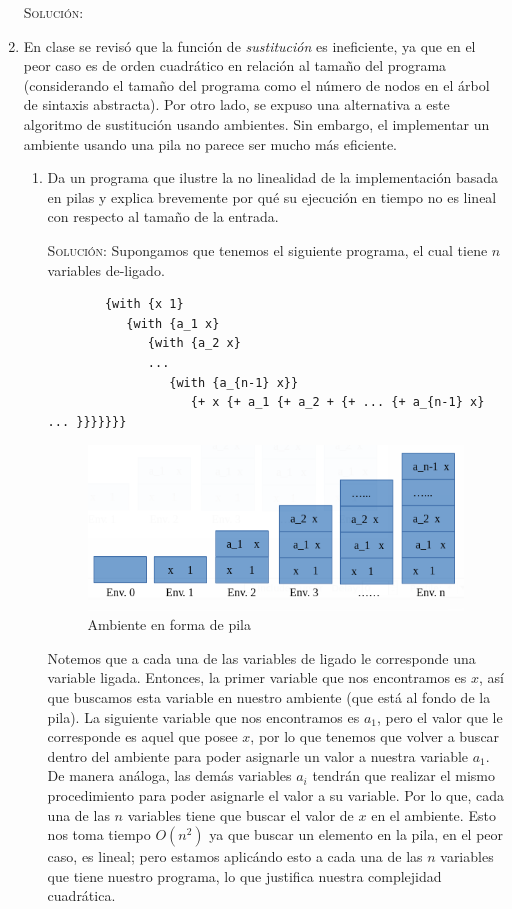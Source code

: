 \documentclass[letterpaper,11pt]{article}
\begin{document}
\begin{enumerate}
   \textsc{Solución:}

   \item En clase se revisó que la función de \textit{sustitución} es 
   ineficiente, ya que en el peor caso es de orden cuadrático en relación 
   al tamaño del programa (considerando el tamaño del programa como el 
   número de nodos en el árbol de sintaxis abstracta). Por otro lado, se 
   expuso una alternativa a este algoritmo de sustitución usando 
   ambientes. Sin embargo, el implementar un ambiente usando una pila no 
   parece ser mucho más eficiente.
   \begin{enumerate}
        \item Da un programa que ilustre la no linealidad de la implementación
        basada en pilas y explica brevemente por qué su ejecución en tiempo no
        es lineal con respecto al tamaño de la entrada.

        \textsc{Solución:} Supongamos que tenemos el siguiente programa, el 
        cual tiene $n$ variables de-ligado.
        \begin{verbatim}
        {with {x 1} 
           {with {a_1 x} 
              {with {a_2 x} 
              ...
                 {with {a_{n-1} x}} 
                    {+ x {+ a_1 {+ a_2 + {+ ... {+ a_{n-1} x} ... }}}}}}}
        \end{verbatim}

        \begin{figure}[h]
            \centering
            \includegraphics[width=0.5\linewidth]{imagenes/ejercicio3.png}
            \caption{Ambiente en forma de pila}
        \end{figure}

        Notemos que a cada una de las variables de ligado le corresponde una 
        variable ligada. Entonces, la primer variable que nos encontramos es
        $x$, así que buscamos esta variable en nuestro ambiente (que está al 
        fondo de la pila). La siguiente variable que nos encontramos es 
        \texttt{$a_1$}, pero el valor que le corresponde es aquel que posee 
        $x$, por lo que tenemos que volver a buscar dentro del ambiente 
        para poder asignarle un valor a nuestra variable \texttt{$a_1$}. 
        De manera análoga, las demás variables $a_i$ tendrán que realizar el 
        mismo procedimiento para poder asignarle el valor a su variable. 
        Por lo que, cada una de las $n$ variables tiene que buscar el valor 
        de $x$ en el ambiente. Esto nos toma tiempo $O(n^2)$ ya que buscar 
        un elemento en la pila, en el peor caso, es lineal; pero estamos 
        aplicándo esto a cada una de las $n$ variables que tiene nuestro 
        programa, lo que justifica nuestra complejidad cuadrática. 


\end{enumerate}
\end{enumerate}
\end{document}
